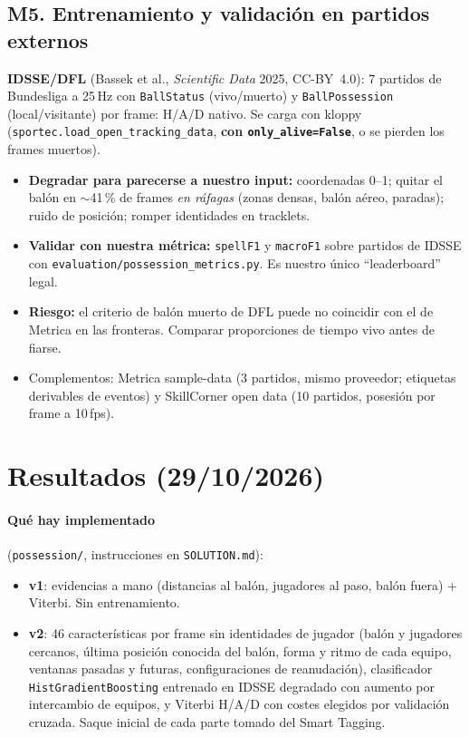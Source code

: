 \documentclass[11pt,a4paper]{article}
\begin{document}
\subsection{M5. Entrenamiento y validaci\'on en partidos externos}
\textbf{IDSSE/DFL} (Bassek et al., \emph{Scientific Data} 2025, CC-BY~4.0): 7 partidos de
Bundesliga a 25\,Hz con \texttt{BallStatus} (vivo/muerto) y \texttt{BallPossession}
(local/visitante) por frame: H/A/D nativo. Se carga con kloppy
(\texttt{sportec.load\_open\_tracking\_data}, \textbf{con \texttt{only\_alive=False}}, o se
pierden los frames muertos).

\begin{itemize}
  \item \textbf{Degradar para parecerse a nuestro input:} coordenadas 0--1; quitar el bal\'on en
        $\sim$41\,\% de frames \emph{en r\'afagas} (zonas densas, bal\'on a\'ereo, paradas); ruido de
        posici\'on; romper identidades en tracklets.
  \item \textbf{Validar con nuestra m\'etrica:} \texttt{spellF1} y \texttt{macroF1} sobre partidos
        de IDSSE con \texttt{evaluation/possession\_metrics.py}. Es nuestro \'unico ``leaderboard''
        legal.
  \item \textbf{Riesgo:} el criterio de bal\'on muerto de DFL puede no coincidir con el de Metrica
        en las fronteras. Comparar proporciones de tiempo vivo antes de fiarse.
  \item Complementos: Metrica sample-data (3 partidos, mismo proveedor; etiquetas derivables de
        eventos) y SkillCorner open data (10 partidos, posesi\'on por frame a 10\,fps).
\end{itemize}

\section{Resultados (29/10/2026)}

\paragraph{Qu\'e hay implementado} (\texttt{possession/}, instrucciones en \texttt{SOLUTION.md}):
\begin{itemize}
  \item \textbf{v1}: evidencias a mano (distancias al bal\'on, jugadores al paso, bal\'on fuera) +
        Viterbi. Sin entrenamiento.
  \item \textbf{v2}: 46 caracter\'isticas por frame sin identidades de jugador (bal\'on y jugadores
        cercanos, \'ultima posici\'on conocida del bal\'on, forma y ritmo de cada equipo, ventanas
        pasadas y futuras, configuraciones de reanudaci\'on), clasificador
        \texttt{HistGradientBoosting} entrenado en IDSSE degradado con aumento por intercambio de
        equipos, y Viterbi H/A/D con costes elegidos por validaci\'on cruzada. Saque inicial de
        cada parte tomado del Smart Tagging.
\end{itemize}
\end{document}
